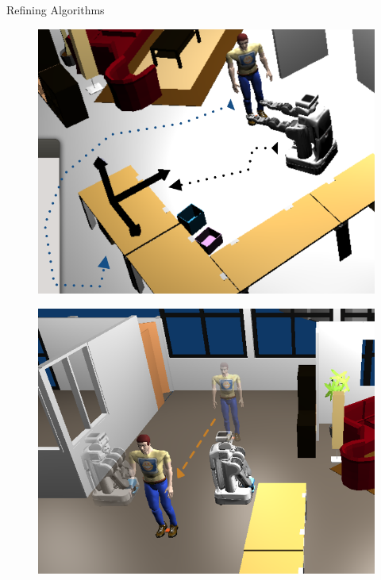 \documentclass[compress]{beamer}
\begin{document}
\begin{frame}{Refining Algorithms}
    \begin{multicols}{2}
        \null \vfill
    \begin{figure}
        \centering
        \includegraphics[width=0.9\linewidth]{proto-setup}
    \end{figure}

        \vfill \null
        \columnbreak
        \null \vfill
        \begin{figure}
            \centering
            \includegraphics[width=0.9\linewidth]{morsehanp}
        \end{figure}
        \vfill \null
    \end{multicols}
\end{frame}
\end{document}
